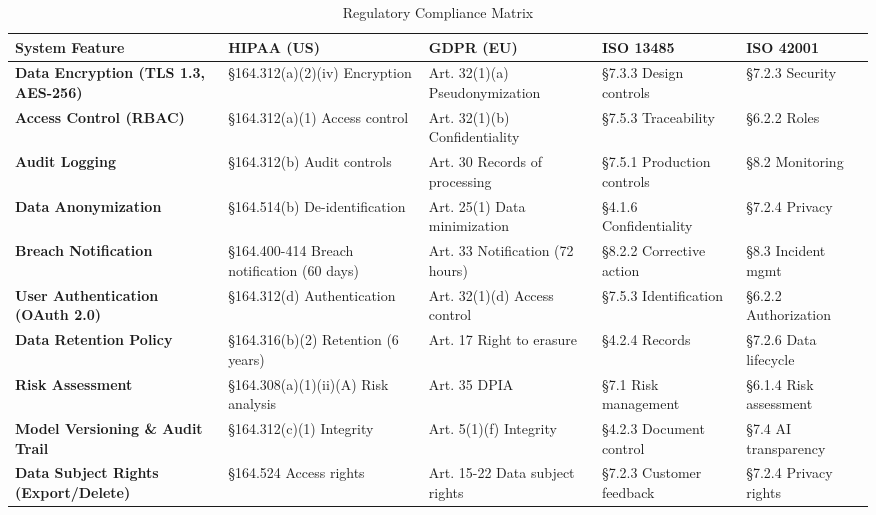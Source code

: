 \documentclass[12pt,a4paper]{article}
\begin{document}
\begin{table}[H]
\centering
\caption{Regulatory Compliance Matrix}
\small
\begin{tabular}{@{}p{3.5cm}p{2.5cm}p{2.2cm}p{2.2cm}p{2cm}@{}}
\toprule
\textbf{System Feature} & \textbf{HIPAA (US)} & \textbf{GDPR (EU)} & \textbf{ISO 13485} & \textbf{ISO 42001} \\ \midrule

\textbf{Data Encryption (TLS 1.3, AES-256)} & 
§164.312(a)(2)(iv) Encryption & 
Art. 32(1)(a) Pseudonymization & 
§7.3.3 Design controls & 
§7.2.3 Security \\

\textbf{Access Control (RBAC)} & 
§164.312(a)(1) Access control & 
Art. 32(1)(b) Confidentiality & 
§7.5.3 Traceability & 
§6.2.2 Roles \\

\textbf{Audit Logging} & 
§164.312(b) Audit controls & 
Art. 30 Records of processing & 
§7.5.1 Production controls & 
§8.2 Monitoring \\

\textbf{Data Anonymization} & 
§164.514(b) De-identification & 
Art. 25(1) Data minimization & 
§4.1.6 Confidentiality & 
§7.2.4 Privacy \\

\textbf{Breach Notification} & 
§164.400-414 Breach notification (60 days) & 
Art. 33 Notification (72 hours) & 
§8.2.2 Corrective action & 
§8.3 Incident mgmt \\

\textbf{User Authentication (OAuth 2.0)} & 
§164.312(d) Authentication & 
Art. 32(1)(d) Access control & 
§7.5.3 Identification & 
§6.2.2 Authorization \\

\textbf{Data Retention Policy} & 
§164.316(b)(2) Retention (6 years) & 
Art. 17 Right to erasure & 
§4.2.4 Records & 
§7.2.6 Data lifecycle \\

\textbf{Risk Assessment} & 
§164.308(a)(1)(ii)(A) Risk analysis & 
Art. 35 DPIA & 
§7.1 Risk management & 
§6.1.4 Risk assessment \\

\textbf{Model Versioning \& Audit Trail} & 
§164.312(c)(1) Integrity & 
Art. 5(1)(f) Integrity & 
§4.2.3 Document control & 
§7.4 AI transparency \\

\textbf{Data Subject Rights (Export/Delete)} & 
§164.524 Access rights & 
Art. 15-22 Data subject rights & 
§7.2.3 Customer feedback & 
§7.2.4 Privacy rights \\


\end{tabular}
\end{table}
\end{document}
